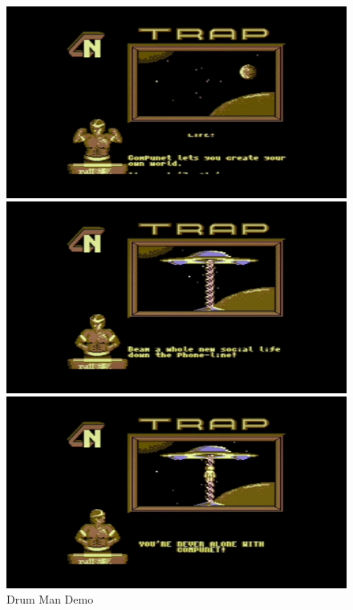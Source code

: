 \begin{figure}[h]
  \begin{minipage}[b]{0.30\linewidth}
    \centering
    \includegraphics[width=\linewidth]{images/demoscene/demos/drumman1.png}
  \end{minipage}
  \hfill
  \begin{minipage}[b]{0.30\linewidth}
    \centering
    \includegraphics[width=\linewidth]{images/demoscene/demos/drumman2.png}
  \end{minipage}
  \hfill
  \begin{minipage}[b]{0.30\linewidth}
    \centering
    \includegraphics[width=\linewidth]{images/demoscene/demos/drumman3.png}
  \end{minipage}
  \caption{Drum Man Demo}
  \label{drumman}
\end{figure}



